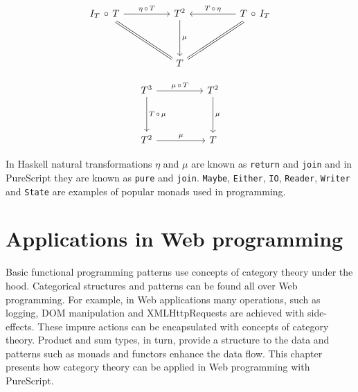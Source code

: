 \documentclass[article]{aaltoseries}
\begin{document}
    \begin{equation}
      \label{identity}
      \begin{tikzcd}[row sep=huge, column sep=huge]
        I_T\, \circ\, T
        \arrow[r, "\eta\, \circ\, T"]
        \arrow[dr, equal]
        & T^2
        \arrow[d, "\mu"]
        & T\, \circ\, I_T
        \arrow[l, "T\, \circ\, \eta"{above}]
        \arrow[dl, equal] \\
        {}
        & T
        &
      \end{tikzcd}
    \end{equation}

    \begin{equation}
      \label{associativity}
      \begin{tikzcd}[row sep=huge, column sep=huge]
        T^3 \arrow[r, "\mu\, \circ\, T"]
        \arrow[d, "T\, \circ\, \mu"]
        & T^2 \arrow[d, "\mu"] \\
        T^2 \arrow[r, "\mu"]
        & T
      \end{tikzcd}
    \end{equation}

    In Haskell natural transformations $\eta$ and $\mu$ are known as
    \lstinline|return| and \lstinline|join| and in PureScript they are known as
    \lstinline|pure| and \lstinline|join|. \lstinline|Maybe|,
    \lstinline|Either|, \lstinline|IO|, \lstinline|Reader|, \lstinline|Writer|
    and \lstinline|State| are examples of popular monads used in programming.



\section{Applications in Web programming}

Basic functional programming patterns use concepts of category theory under the
hood. Categorical structures and patterns can be found all over Web
programming. For example, in Web applications many operations, such as logging,
DOM manipulation and XMLHttpRequests are achieved with side-effects. These
impure actions can be encapsulated with concepts of category theory. Product and
sum types, in turn, provide a structure to the data and patterns such as monads and
functors enhance the data flow. This chapter presents how category
theory can be applied in Web programming with PureScript.

\end{document}
